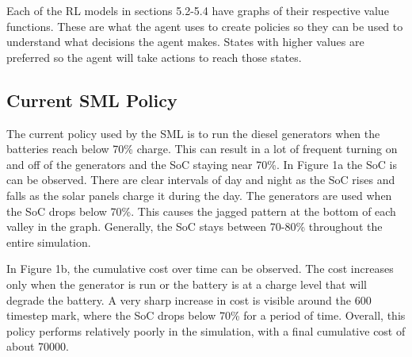 \documentclass{article}
\begin{document}
Each of the RL models in sections 5.2-5.4 have graphs of their respective value functions. These are what the agent uses to create policies so they can be used to understand what decisions the agent makes. States with higher values are preferred so the agent will take actions to reach those states.

\subsection{Current SML Policy}

The current policy used by the SML is to run the diesel generators when the batteries reach below 70\% charge. This can result in a lot of frequent turning on and off of the generators and the SoC staying near 70\%. In Figure 1a the SoC is can be observed. There are clear intervals of day and night as the SoC rises and falls as the solar panels charge it during the day. The generators are used when the SoC drops below 70\%. This causes the jagged pattern at the bottom of each valley in the graph. Generally, the SoC stays between 70-80\% throughout the entire simulation.

In Figure 1b, the cumulative cost over time can be observed. The cost increases only when the generator is run or the battery is at a charge level that will degrade the battery. A very sharp increase in cost is visible around the 600 timestep mark, where the SoC drops below 70\% for a period of time. Overall, this policy performs relatively poorly in the simulation, with a final cumulative cost of about 70000.
\end{document}
